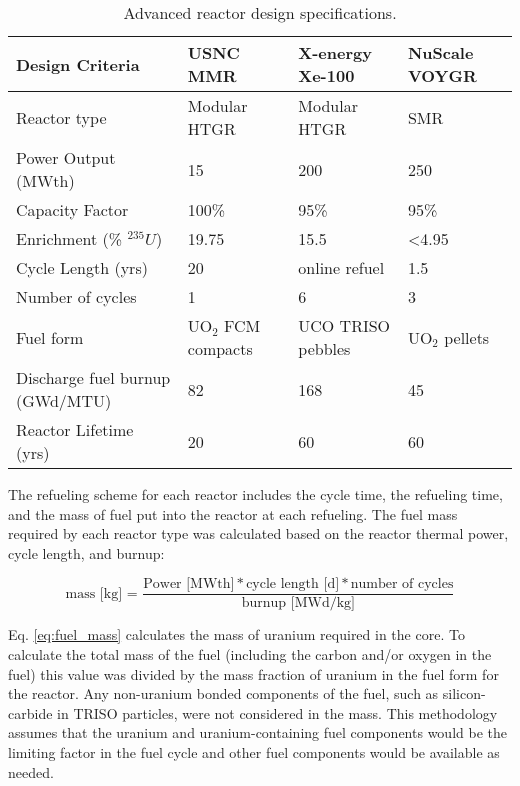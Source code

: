 \begin{table}[ht]
    \centering
    \caption{Advanced reactor design specifications.}
    \label{tab:reactor_summary}
    \renewcommand{\arraystretch}{1.5}
    \begin{tabular}{p{3.5cm}p{3cm}p{3cm}p{3cm}}
        \hline
        Design Criteria & \gls{USNC} \gls{MMR} \cite{noauthor_usnc_2021} & 
        X-energy Xe-100 \cite{mulder_overview_2021} & NuScale VOYGR 
        \cite{nuscale_chapter_2020-1,reyes_nuscale_2021,reyes_correction_2022}\\
        \hline
        Reactor type & Modular HTGR & Modular HTGR & SMR\\
        Power Output (MWth) & 15 & 200  & 250 \\
        Capacity Factor & 100\% & 95\% & 95\% \\
        Enrichment (\% $^{235}U$) & 19.75 & 15.5 & <4.95 \\
        Cycle Length (yrs) & 20 & online refuel & 1.5\\
        Number of cycles & 1 & 6 & 3\\
        Fuel form & UO$_2$ \gls{FCM} compacts & UCO \gls{TRISO} pebbles & UO$_2$ pellets\\
        Discharge fuel burnup (GWd/MTU) & 82 & 168  & 45 \\
        Reactor Lifetime (yrs)& 20 & 60 & 60 \\
        \hline
    \end{tabular}
\end{table}

The refueling scheme for each reactor includes 
the cycle time, the refueling time, and the mass of fuel put into the reactor 
at each refueling. The fuel mass required by 
each reactor type was calculated based on the reactor thermal power, 
cycle length, and burnup:

\begin{equation}
    \text{mass [kg] = }\frac{\text{Power [MWth]}* \text{cycle 
    length [d]} * \text{number of cycles}}{\text{burnup [MWd/kg]}}
    \label{eq:fuel_mass}
\end{equation}

\noindent Eq. \ref{eq:fuel_mass} calculates the mass of uranium required 
in the core. To calculate the total mass of the fuel (including the carbon 
and/or oxygen in the fuel) this value was divided by the mass fraction of 
uranium in the fuel form for the reactor. Any non-uranium bonded components 
of the fuel, such as silicon-carbide in \gls{TRISO} particles, were 
not considered in the mass. This methodology assumes that the 
uranium and uranium-containing fuel components would be the limiting 
factor in the fuel cycle and other fuel components would be available as 
needed. 


